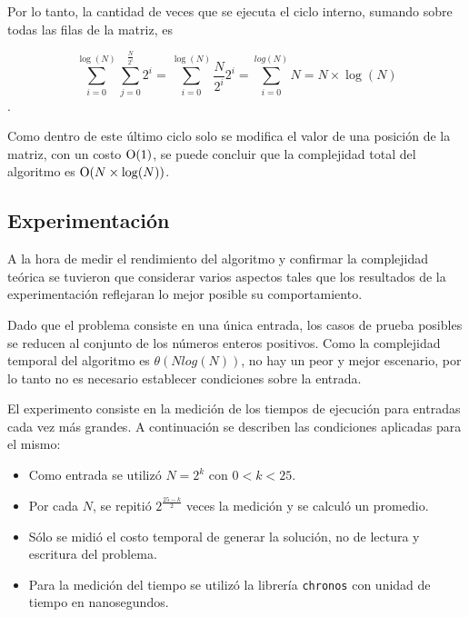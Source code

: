       Por lo tanto, la cantidad de veces que se ejecuta el ciclo interno, sumando sobre todas las filas de la matriz, es

      \[\sum_{i = 0}^{\log(N)} \sum_{j = 0}^{\frac{N}{2^i}} 2^i = \sum_{i = 0}^{\log(N)} \frac{N}{2^i} 2^i = \sum_{i = 0}^{log(N)} N = N \times \log(N)\].

      Como dentro de este último ciclo solo se modifica el valor de una posición de la matriz, con un costo $\operatorname{O}(1)$, se puede concluir que la complejidad total del algoritmo es $\operatorname{O}(N \times \log(N))$. 



    \subsection{Experimentación}

	A la hora de medir el rendimiento del algoritmo y confirmar la complejidad
	teórica se tuvieron que considerar varios aspectos tales que los
	resultados de la experimentación reflejaran lo mejor posible su
	comportamiento.

	Dado que el problema consiste en una única entrada, los casos de prueba
	posibles se reducen al conjunto de los números enteros positivos. Como la
	complejidad temporal del algoritmo es $\theta(Nlog(N))$, no hay un peor
	y mejor escenario, por lo tanto no es necesario establecer condiciones sobre
	la entrada.

	El experimento consiste en la medición de los tiempos de ejecución para
	entradas cada vez más grandes. A continuación se describen las condiciones aplicadas
	para el mismo:

	\begin{itemize}
		\item{Como entrada se utilizó $N = 2^{k}$ con $0 < k < 25.$}
		\item{Por cada $N$, se repitió $2^{\frac{25 - k}{2}}$ veces la medición y se calculó un
			promedio.}
		\item{Sólo se midió el costo temporal de generar la solución, no
			de lectura y escritura del problema.}
		\item{Para la medición del tiempo se utilizó la librería \texttt{chronos}
			con unidad de tiempo en nanosegundos.}
	\end{itemize}

